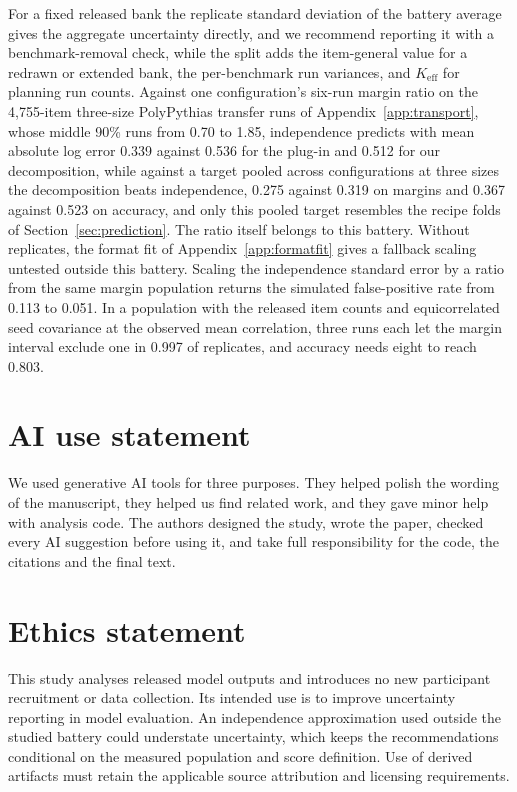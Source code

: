 For a fixed released bank the replicate standard deviation of the battery average gives the aggregate uncertainty directly, and we recommend reporting it with a benchmark-removal check, while the split adds the item-general value for a redrawn or extended bank, the per-benchmark run variances, and $K_{\mathrm{eff}}$ for planning run counts. Against one configuration's six-run margin ratio on the 4,755-item three-size PolyPythias transfer runs of Appendix~\ref{app:transport}, whose middle 90\% runs from 0.70 to 1.85, independence predicts with mean absolute log error 0.339 against 0.536 for the plug-in and 0.512 for our decomposition, while against a target pooled across configurations at three sizes the decomposition beats independence, 0.275 against 0.319 on margins and 0.367 against 0.523 on accuracy, and only this pooled target resembles the recipe folds of Section~\ref{sec:prediction}. The ratio itself belongs to this battery. Without replicates, the format fit of Appendix~\ref{app:formatfit} gives a fallback scaling untested outside this battery. Scaling the independence standard error by a ratio from the same margin population returns the simulated false-positive rate from 0.113 to 0.051. In a population with the released item counts and equicorrelated seed covariance at the observed mean correlation, three runs each let the margin interval exclude one in 0.997 of replicates, and accuracy needs eight to reach 0.803.

\label{maintext:end}
\section*{AI use statement}
We used generative AI tools for three purposes. They helped polish the wording of the manuscript, they helped us find related work, and they gave minor help with analysis code. The authors designed the study, wrote the paper, checked every AI suggestion before using it, and take full responsibility for the code, the citations and the final text.

\section*{Ethics statement}
This study analyses released model outputs and introduces no new participant recruitment or data collection. Its intended use is to improve uncertainty reporting in model evaluation. An independence approximation used outside the studied battery could understate uncertainty, which keeps the recommendations conditional on the measured population and score definition. Use of derived artifacts must retain the applicable source attribution and licensing requirements.

